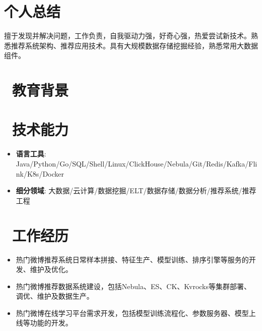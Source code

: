 \documentclass{resume}
\begin{document}


 
\section{\faTags 个人总结}
擅于发现并解决问题，工作负责，自我驱动力强，好奇心强，热爱尝试新技术。熟悉推荐系统架构、推荐应用技术。具有大规模数据存储挖掘经验，熟悉常用大数据组件。

\section{\faGraduationCap\ 教育背景}

\section{\faCogs\ 技术能力}
\begin{itemize}[parsep=0.2ex]
  \item \textbf{语言工具}: Java/Python/Go/SQL/Shell/Linux/ClickHouse/Nebula/Git/Redis/Kafka/Flink/K8s/Docker
  \item \textbf{细分领域}: 大数据/云计算/数据挖掘/ELT/数据存储/数据分析/推荐系统/推荐工程
\end{itemize}


\section{\faSuitcase\ 工作经历}
\begin{itemize}
  \item 热门微博推荐系统日常样本拼接、特征生产、模型训练、排序引擎等服务的开发、维护及优化。
  \item 热门微博推荐数据系统建设，包括Nebula、ES、CK、Kvrocks等集群部署、调优、维护及数据生产。
  \item 热门微博在线学习平台需求开发，包括模型训练流程化、参数服务器、模型上线等功能的开发。
\end{itemize}
\end{document}
